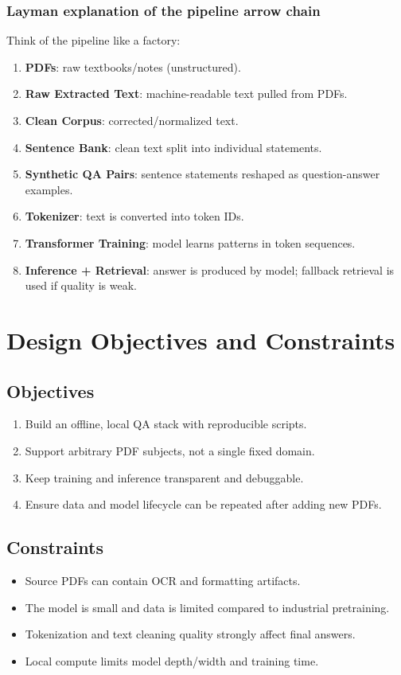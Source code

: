 \documentclass[a4paper,11pt]{article}
\begin{document}
\subsubsection{Layman explanation of the pipeline arrow chain}
Think of the pipeline like a factory:
\begin{enumerate}[leftmargin=1.5em]
    \item \textbf{PDFs}: raw textbooks/notes (unstructured).
    \item \textbf{Raw Extracted Text}: machine-readable text pulled from PDFs.
    \item \textbf{Clean Corpus}: corrected/normalized text.
    \item \textbf{Sentence Bank}: clean text split into individual statements.
    \item \textbf{Synthetic QA Pairs}: sentence statements reshaped as question-answer examples.
    \item \textbf{Tokenizer}: text is converted into token IDs.
    \item \textbf{Transformer Training}: model learns patterns in token sequences.
    \item \textbf{Inference + Retrieval}: answer is produced by model; fallback retrieval is used if quality is weak.
\end{enumerate}

\section{Design Objectives and Constraints}
\subsection{Objectives}
\begin{enumerate}[leftmargin=1.5em]
    \item Build an offline, local QA stack with reproducible scripts.
    \item Support arbitrary PDF subjects, not a single fixed domain.
    \item Keep training and inference transparent and debuggable.
    \item Ensure data and model lifecycle can be repeated after adding new PDFs.
\end{enumerate}

\subsection{Constraints}
\begin{itemize}[leftmargin=1.5em]
    \item Source PDFs can contain OCR and formatting artifacts.
    \item The model is small and data is limited compared to industrial pretraining.
    \item Tokenization and text cleaning quality strongly affect final answers.
    \item Local compute limits model depth/width and training time.
\end{itemize}
\end{document}
